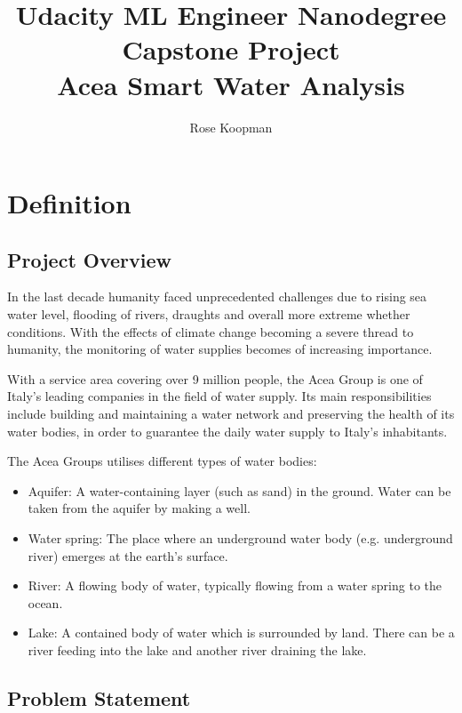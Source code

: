 \documentclass{article}
\begin{document}
\title{Udacity ML Engineer Nanodegree \\ Capstone Project \\ Acea Smart Water Analysis}
\author{Rose Koopman}
\date{}
\maketitle


\section{Definition}

\subsection*{Project Overview}

In the last decade humanity faced unprecedented challenges due to rising sea water level, flooding of rivers, draughts and overall more extreme whether conditions. With the effects of climate change becoming a severe thread to humanity, the monitoring of water supplies becomes of increasing importance. 

With a service area covering over 9 million people, the Acea Group \cite{acea} is one of Italy's leading companies in the field of water supply. Its main responsibilities include building and maintaining a water network and preserving the health of its water bodies,  in order to guarantee the daily water supply to Italy's inhabitants. 

The Acea Groups utilises different types of water bodies:

\begin{itemize}
\item Aquifer: A water-containing layer (such as sand) in the ground. Water can be taken from the aquifer by making a well. 
\item Water spring: The place where an underground water body (e.g. underground river) emerges at the earth's surface.
\item River: A flowing body of water, typically flowing from a water spring to the ocean.
\item Lake: A contained body of water which is surrounded by land. There can be a river feeding into the lake and another river draining the lake.
\end{itemize}


\subsection*{Problem Statement}
\end{document}
